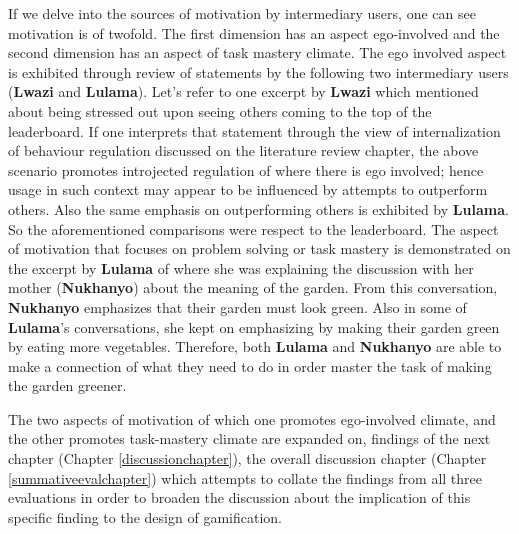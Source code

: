 If we delve into the sources of motivation by intermediary users, one can see motivation is of twofold. The first dimension has an aspect ego-involved and the second dimension has an aspect of task mastery climate. The ego involved aspect is exhibited through review of statements by the following two intermediary users (\textbf{Lwazi} and \textbf{Lulama}). Let's refer to one excerpt by \textbf{Lwazi} which mentioned about being stressed out upon seeing others coming to the top of the leaderboard. If one interprets that statement through the view of internalization of behaviour regulation discussed on the literature review chapter, the above scenario promotes introjected regulation of where there is ego involved; hence usage in such context may appear to be influenced by attempts to outperform others. Also the same emphasis on outperforming others is exhibited by \textbf{Lulama}. So the aforementioned comparisons were respect to the leaderboard. The aspect of motivation that focuses on problem solving or task mastery is demonstrated on the excerpt by \textbf{Lulama} of where she was explaining the discussion with her mother (\textbf{Nukhanyo}) about the meaning of the garden. From this conversation, \textbf{Nukhanyo} emphasizes that their garden must look green. Also in some of \textbf{Lulama}'s conversations, she kept on emphasizing by making their garden green by eating more vegetables. Therefore, both \textbf{Lulama} and \textbf{Nukhanyo} are able to make a connection of what they need to do in order master the task of making the garden greener. 

The two aspects of motivation of which one promotes ego-involved climate, and the other promotes task-mastery climate are expanded on, findings of the next chapter (Chapter \ref{discussionchapter}), the overall discussion chapter (Chapter \ref{summativeevalchapter}) which attempts to collate the findings from all three evaluations in order to broaden the discussion about the implication of this specific finding to the design of gamification.
 
\begin{flushright}
\end{flushright}
